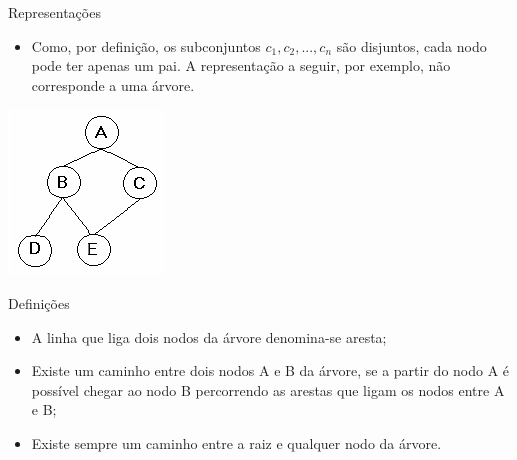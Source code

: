 \documentclass[12pt,table,xcolor={dvipsnames}]{beamer}
\begin{document}
\begin{frame}[fragile]{Representações}
          \begin{itemize}
		  \item Como, por definição, os subconjuntos $c_1, c_2, ..., c_n$ são disjuntos, cada nodo pode ter apenas um pai. A representação a seguir, por exemplo, não corresponde a uma árvore.
          \end{itemize}
          \begin{center}
          \includegraphics[scale=.75]{grafo.png} 
          \end{center}
\end{frame} 

\begin{frame}[fragile]{Definições}
          \begin{itemize}
		  \item A linha que liga dois nodos da árvore denomina-se aresta;
		  \item Existe um caminho entre dois nodos A e B da árvore, se a partir do nodo A é possível chegar ao nodo B percorrendo as arestas que ligam os nodos entre A e B;
		  \item Existe sempre um caminho entre a raiz e qualquer nodo da árvore.
          \end{itemize}
\end{frame} 
\end{document}
